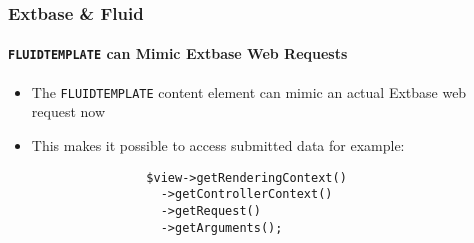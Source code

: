 \begin{frame}[fragile]
	\frametitle{Extbase \& Fluid}
	\framesubtitle{\texttt{FLUIDTEMPLATE} can Mimic Extbase Web Requests}

	\lstset{basicstyle=\small\ttfamily}

	\begin{itemize}
		\item The \texttt{FLUIDTEMPLATE} content element can mimic an actual Extbase web request now
		\item This makes it possible to access submitted data for example:

			\begin{lstlisting}
				$view->getRenderingContext()
				  ->getControllerContext()
				  ->getRequest()
				  ->getArguments();
			\end{lstlisting}

	\end{itemize}

\end{frame}




